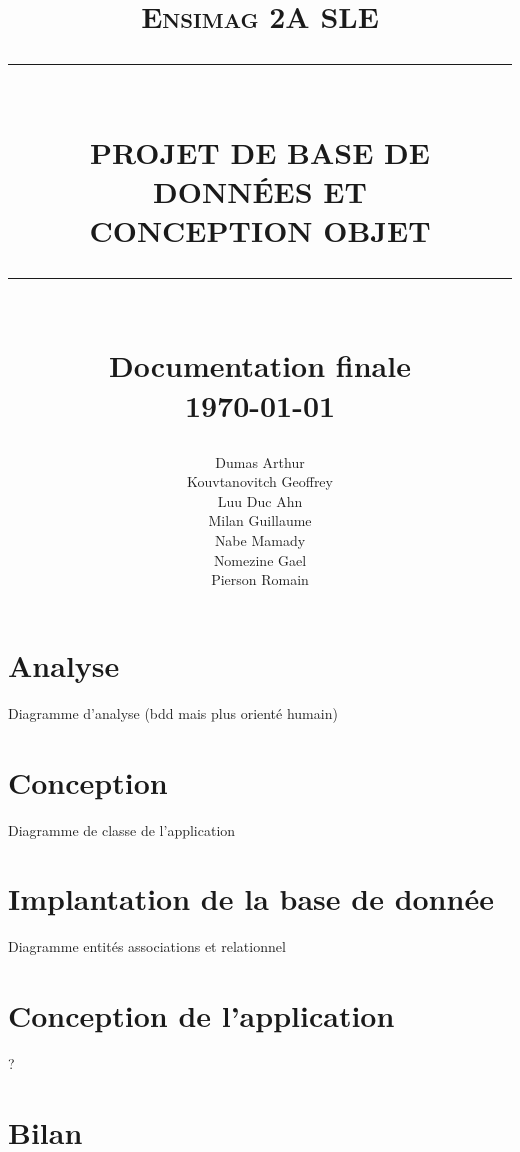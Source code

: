 \documentclass[a4paper, 11pt]{article}
\newcommand{\HRule}[1]{\rule{\linewidth}{#1}}
\begin{document}
\title{ \vspace{3cm}
		\normalsize \textsc{Ensimag 2A SLE}
		\\ [3.0cm]
		\HRule{0.5pt} \\
		\LARGE \textbf{\uppercase{Projet de Base de Données et\\ Conception Objet}}
		\HRule{2pt} \\ [0.5cm]
        \large{Documentation finale} \\ [1cm]
		\normalsize \today \vspace*{6\baselineskip}}	
        
\author{Dumas Arthur \\ Kouvtanovitch Geoffrey \\ Luu Duc Ahn \\ Milan Guillaume \\ Nabe Mamady \\ Nomezine Gael \\ Pierson Romain}
\date{}   

\maketitle
        
	\newpage	
	\renewcommand{\contentsname}{Sommaire}
	\tableofcontents
	\newpage
	
\section{Analyse}

	Diagramme d'analyse (bdd mais plus orienté humain)

\section{Conception}

	Diagramme de classe de l'application

\section{Implantation de la base de donnée}

	Diagramme entités associations et relationnel

\section{Conception de l'application}

	?
	
\section{Bilan}
\end{document}
